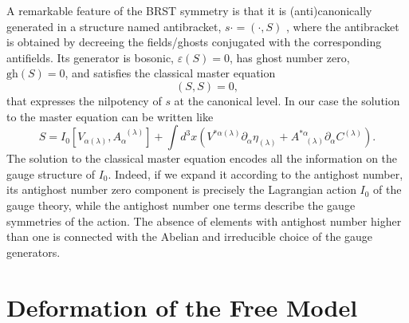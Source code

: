 \documentclass[a4paper,11pt]{article}
\begin{document}
A remarkable feature of the BRST symmetry is that it is (anti)canonically
generated in a structure named antibracket, $s\cdot =\left( \cdot ,S\right) $%
, where the antibracket is obtained by decreeing the fields/ghosts
conjugated with the corresponding antifields. Its generator is bosonic, $%
\varepsilon \left( S\right) =0$, has ghost number zero, $\mathrm{gh}\left(
S\right) =0$, and satisfies the classical master equation
\begin{equation}
\left( S,S\right) =0,  \label{bf49}
\end{equation}
that expresses the nilpotency of $s$ at the canonical level. In our case the
solution to the master equation can be written like
\begin{equation}
S=I_{0}\left[ V_{\alpha (\lambda )},A_{\alpha }^{\;\;(\lambda )}\right]
+\int d^{3}x\left( V^{*\alpha (\lambda )}\partial _{\alpha }\eta _{(\lambda
)}+A_{\;\;\;(\lambda )}^{*\alpha }\partial _{\alpha }C^{(\lambda )}\right) .
\label{bf48}
\end{equation}
The solution to the classical master equation encodes all the information on
the gauge structure of $I_{0}$. Indeed, if we expand it according to the
antighost number, its antighost number zero component is precisely the
Lagrangian action $I_{0}$ of the gauge theory, while the antighost number
one terms describe the gauge symmetries of the action. The absence of
elements with antighost number higher than one is connected with the Abelian
and irreducible choice of the gauge generators.

\section{Deformation of the Free Model}
\end{document}
